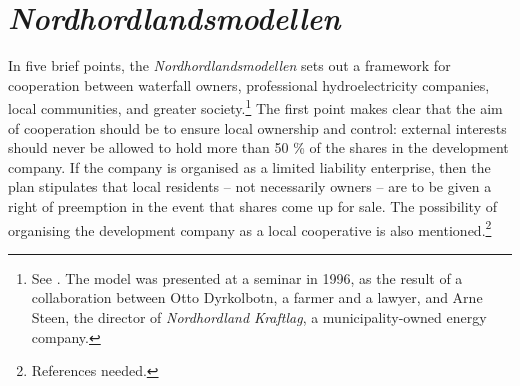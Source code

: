 
\section{{\it Nordhordlandsmodellen}}

In five brief points, the {\it Nordhordlandsmodellen} sets out a framework for cooperation between waterfall owners, professional hydroelectricity companies, local communities, and greater society.\footnote{See \cite{dyrkolbotn96}. The model was presented at a seminar in 1996, as the result of a collaboration between Otto Dyrkolbotn, a farmer and a lawyer, and Arne Steen, the director of {\it Nordhordland Kraftlag}, a municipality-owned energy company.} %
The first point makes clear that the aim of cooperation should be to ensure local ownership and control: external interests should never be allowed to hold more than 50 \% of the shares in the development company. If the company is organised as a limited liability enterprise, then the plan stipulates that local residents -- not necessarily owners -- are to be given a right of preemption in the event that shares come up for sale. The possibility of organising the development company as a local cooperative is also mentioned.\footnote{References needed.}


